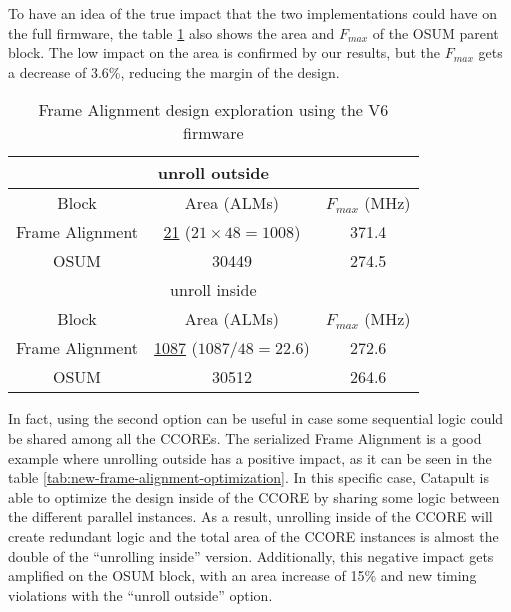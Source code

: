 To have an idea of the true impact that the two implementations could have on the full firmware, the table \ref{tab:frame-alignment-optimization} also shows the area and \(F_{max}\) of the OSUM parent block. The low impact on the area is confirmed by our results, but the \(F_{max}\) gets a decrease of 3.6\%, reducing the margin of the design.

\begin{table}[ht]
    \centering
    \begin{tabular}{|c|c|c|}
        \hline
        \hline
        \multicolumn{3}{|c|}{unroll outside} \\
        \hline
        Block & Area (ALMs) & \(F_{max}\) (MHz) \\
        \hline
        Frame Alignment & \underline{21} (\(21\times48=1008\)) & 371.4 \\
        OSUM & 30449 & 274.5 \\
        \hline
        \hline
        \multicolumn{3}{|c|}{unroll inside} \\
        \hline
        Block & Area (ALMs) & \(F_{max}\) (MHz) \\
        \hline
        Frame Alignment & \underline{1087} (\(1087/48=22.6\))& 272.6\\
        OSUM & 30512 & 264.6\\
        \hline
    \end{tabular}
    \caption{Frame Alignment design exploration using the V6 firmware}
    \label{tab:frame-alignment-optimization}
\end{table}

In fact, using the second option can be useful in case some sequential logic could be shared among all the CCOREs. The serialized Frame Alignment is a good example where unrolling outside has a positive impact, as it can be seen in the table \ref{tab:new-frame-alignment-optimization}. In this specific case, Catapult is able to optimize the design inside of the CCORE by sharing some logic between the different parallel instances. As a result, unrolling inside of the CCORE will create redundant logic and the total area of the CCORE instances is almost the double of the ``unrolling inside'' version. Additionally, this negative impact gets amplified on the OSUM block, with an area increase of 15\% and new timing violations with the ``unroll outside'' option.


